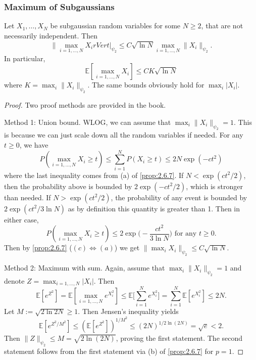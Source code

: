 \subsubsection{Maximum of Subgaussians}
\begin{proposition}
\label{prop:2.7.6}
Let $X_1, \dots, X_N$ be subgaussian random variables for some $N \geq 2$, that are not necessarily 
independent. Then 
\[ \lVert \max_{i = 1, \dots, N} X_i rVert|_{\psi_2} \leq C \sqrt{\ln{N}} 
\max_{i = 1, \dots, N} \lVert X_i \rVert_{\psi_2}. \]
In particular, 
\[ \mathbb{E}[\max_{i = 1, \dots, N} X_i] \leq CK \sqrt{\ln{N}} \]
where $K = \max_{i} \lVert X_i \rVert_{\psi_2}$. The same bounds obviously hold for $\max_{i}|X_i|$.
\end{proposition}

\begin{proof}
Two proof methods are provided in the book.

Method 1: Union bound. WLOG, we can assume that $\max_{i} \lVert X_i \rVert_{\psi_2} = 1$. 
This is because we can just scale down all the random variables if needed. For any $t \geq 0$, we have 
\[ P(\max_{i = 1, \dots, N} X_i \geq t) \leq \sum_{i = 1}^{N} P(X_i \geq t) \leq 2N \exp{(-ct^2)} \]
where the last inequality comes from (a) of \cref{prop:2.6.7}. If $N < \exp{(ct^2 / 2)}$, then the 
probability above is bounded by $2\exp{(-ct^2 / 2)}$, which is stronger than needed. If 
$N > \exp{(ct^2 / 2)}$, the probability of any event is bounded by $2\exp{(ct^2 / 3 \ln{N})}$ as by definition 
this quantity is greater than 1. Then in either case, 
\[  P(\max_{i = 1, \dots, N} X_i \geq t) \leq 2 \exp{\biggl( -\frac{ct^2}{3 \ln{N}} \biggr)} 
\text{ for any } t \geq 0. \]
Then by \cref{prop:2.6.7} ($(c) \iff (a)$) we get $\lVert \max_{i} X_i \rVert_{\psi_2} \leq C \sqrt{\ln{N}}.$

Method 2: Maximum with sum. Again, assume that $\max_{i} \lVert X_i \rVert_{\psi_2} = 1$ and denote 
$Z = \max_{i = 1, \dots, N} |X_i|$. Then 
\[ \mathbb{E}[e^{Z^2}] = \mathbb{E}[\max_{i = 1, \dots, N} e^{X_i^2}] 
\leq \mathbb{E}\biggl[ \sum_{i = 1}^{N} e^{X_i^2} \biggr] = \sum_{i = 1}^{N} \mathbb{E}[e^{X_i^2}] 
\leq 2N. \]
Let $M := \sqrt{2 \ln{2N}} \geq 1$. Then Jensen's inequality yields 
\[ \mathbb{E}[e^{Z^2 / M^2}] \leq (\mathbb{E}[e^{Z^2}])^{1 / M^2} 
\leq (2N)^{1 / 2 \ln{(2N)}} = \sqrt{e} < 2. \]
Then $\lVert Z \rVert_{\psi_2} \leq M = \sqrt{2 \ln{(2N)}}$, proving the first statement. 
The second statement follows from the first statement via (b) of \cref{prop:2.6.7} for $p = 1$.
\end{proof}

